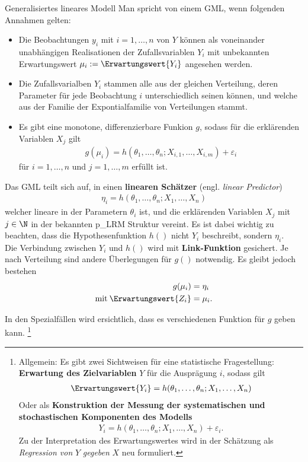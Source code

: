 \begin{Definition}{Generalisiertes lineares Modell}
	Man spricht von einem \gls{GML}, wenn folgenden Annahmen gelten:
	\begin{itemize}
		\item Die Beobachtungen $y_i$ mit $i=1,\dots, n$ von $Y$ können als voneinander unabhängigen Realisationen der Zufallsvariablen $Y_i$ mit unbekannten Erwartungswert $\mu_i:= \Erwartungswert{Y_i}$ angesehen werden.
		\item Die Zufallsvarialben $Y_i$ stammen alle aus der gleichen Verteilung, deren Parameter für jede Beobachtung $i$ unterschiedlich seinen können, und welche aus der Familie der Expontialfamilie von Verteilungen stammt.
		\item Es gibt eine monotone, differenzierbare Funkion $g$, sodass für die erklärenden Variablen $X_j$ gilt
		\begin{align}
			g(\mu_i) =h(\theta_1,\dots, \theta_n; X_{i,1}, \dots, X_{i,m}) + \varepsilon_i
		\end{align}
		für $i= 1, \dots, n$ und $j= 1, \dots, m$ erfüllt ist.
	\end{itemize}
\end{Definition}
Das \gls{GML} teilt sich auf, in einen \textbf{linearen Schätzer} (engl. \textit{linear Predictor})
\begin{align}
	\eta_i = h(\theta_1,\dots, \theta_n; X_1, \dots, X_n)
\end{align}
welcher lineare in der Parametern $\theta_i$ ist, und die erklärenden Variablen $X_j$ mit $j\in\N$ in der bekannten \gls{p_LRM} Struktur vereint. Es ist dabei wichtig zu beachten, dass die Hypothesenfunktion $h()$ nicht $Y_i$ beschreibt, sondern $\eta_i$.\\

Die Verbindung zwischen $Y_i$ und $h()$ wird mit \textbf{Link-Funktion} gesichert. Je nach Verteilung sind andere Überlegungen für $g()$ notwendig. Es gleibt jedoch bestehen
\begin{align}
	g(\mu_i)&= \eta_i \\
	\text{mit}\: \Erwartungswert{Z_i} &=\mu_i.	
\end{align}

In den Spezialfällen wird ersichtlich, dass es verschiedenen Funktion für $g$ geben kann. 
\footnote{Allgemein: Es gibt zwei Sichtweisen für eine statistische Fragestellung: \textbf{Erwartung des Zielvariablen} $Y$ für die Ausprägung $i$, sodass gilt
	\begin{align}
		\Erwartungswert{Y_i}=  h(\theta_1,\dots, \theta_n; X_1, \dots, X_n)
	\end{align}
	Oder als \textbf{Konstruktion der Messung der systematischen und stochastischen Komponenten des Modells}
	\begin{align}
		Y_i	 = h(\theta_1,\dots, \theta_n; X_1, \dots, X_n) + \varepsilon_i.
	\end{align}
	Zu der Interpretation des Erwartungswertes wird in der Schätzung als \textit{Regression von} $Y$ \textit{gegeben} $X$ neu formuliert.}



